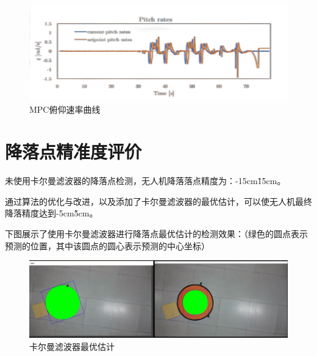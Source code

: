 \begin{figure}[ht]
  \centering
  \includegraphics[width=0.8\linewidth]{./Figure/MPC-Pitch-Rates.png}
  \caption{MPC俯仰速率曲线}\label{Fig:img18}
\end{figure}

\section{降落点精准度评价}

未使用卡尔曼滤波器的降落点检测，无人机降落落点精度为：-15cm\~15cm。

通过算法的优化与改进，以及添加了卡尔曼滤波器的最优估计，可以使无人机最终降落精度达到-5cm\~5cm。

下图展示了使用卡尔曼滤波器进行降落点最优估计的检测效果：（绿色的圆点表示预测的位置，其中该圆点的圆心表示预测的中心坐标）

\begin{figure}[ht]
  \centering
  \includegraphics[width=0.8\linewidth]{./Figure/Kalman_Prediction.png}
  \caption{卡尔曼滤波器最优估计}\label{Fig:img19}
\end{figure}
